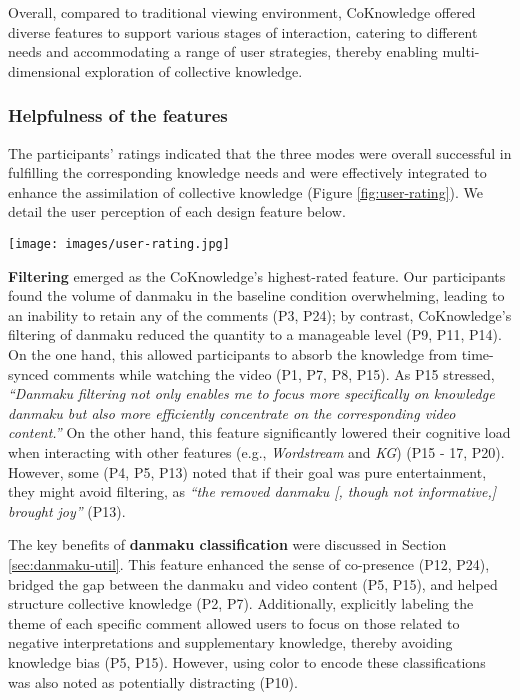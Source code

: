 Overall, compared to traditional viewing environment, CoKnowledge offered diverse features to support various stages of interaction, catering to different needs and accommodating a range of user strategies, thereby enabling multi-dimensional exploration of collective knowledge.

\subsubsection{Helpfulness of the features}
The participants' ratings indicated that the three modes were overall successful in fulfilling the corresponding knowledge needs and were effectively integrated to enhance the assimilation of collective knowledge (Figure \ref{fig:user-rating}). 
We detail the user perception of each design feature below. 
\begin{figure*}[h]
  \centering
  \texttt{[image: images/user-rating.jpg]}
  \caption{User ratings on CoKnowledge's features, where \textit{UI} stands for \textit{User Interface}. For all items, a higher rating indicates better performance.}
  \label{fig:user-rating}
\end{figure*}


\textbf{Filtering} emerged as the CoKnowledge's highest-rated feature. Our participants found the volume of danmaku in the baseline condition overwhelming, leading to an inability to retain any of the comments (P3, P24); by contrast, CoKnowledge's filtering of danmaku reduced the quantity to a manageable level (P9, P11, P14). On the one hand, this allowed participants to absorb the knowledge from time-synced comments while watching the video (P1, P7, P8, P15). 
As P15 stressed, \textit{``Danmaku filtering not only enables me to focus more specifically on \textit{knowledge danmaku} but also more efficiently concentrate on the corresponding video content.''}
On the other hand, this feature significantly lowered their cognitive load when interacting with other features (e.g., \textit{Wordstream} and \textit{KG}) (P15 - 17, P20). However, some (P4, P5, P13) noted that if their goal was pure entertainment, they might avoid filtering, as \textit{``the removed danmaku [, though not informative,] brought joy''} (P13).

The key benefits of \textbf{danmaku classification} were discussed in Section \ref{sec:danmaku-util}. This feature enhanced the sense of co-presence (P12, P24), bridged the gap between the danmaku and video content (P5, P15), and helped structure collective knowledge (P2, P7). Additionally, explicitly labeling the theme of each specific comment allowed users to focus on those related to negative interpretations and supplementary knowledge, thereby avoiding knowledge bias (P5, P15). However, using color to encode these classifications was also noted as potentially distracting (P10).

